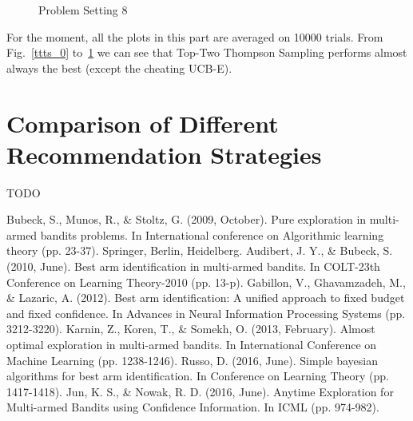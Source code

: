 \documentclass[runningheads,a4paper]{llncs}
\begin{document}
\begin{figure}%
    \centering
    \qquad
    \caption{Problem Setting 8}%
    \label{ttts_8}%
\end{figure}

For the moment, all the plots in this part are averaged on 10000 trials. From Fig.~\ref{ttts_0} to~\ref{ttts_8} we can see that Top-Two Thompson Sampling performs almost always the best (except the cheating UCB-E).

\section{Comparison of Different Recommendation Strategies}

TODO

\begin{thebibliography}{4}

 Bubeck, S., Munos, R., \& Stoltz, G. (2009, October). Pure exploration in multi-armed bandits problems. In International conference on Algorithmic learning theory (pp. 23-37). Springer, Berlin, Heidelberg.
 Audibert, J. Y., \& Bubeck, S. (2010, June). Best arm identification in multi-armed bandits. In COLT-23th Conference on Learning Theory-2010 (pp. 13-p).
 Gabillon, V., Ghavamzadeh, M., \& Lazaric, A. (2012). Best arm identification: A unified approach to fixed budget and fixed confidence. In Advances in Neural Information Processing Systems (pp. 3212-3220).
 Karnin, Z., Koren, T., \& Somekh, O. (2013, February). Almost optimal exploration in multi-armed bandits. In International Conference on Machine Learning (pp. 1238-1246).
 Russo, D. (2016, June). Simple bayesian algorithms for best arm identification. In Conference on Learning Theory (pp. 1417-1418).
 Jun, K. S., \& Nowak, R. D. (2016, June). Anytime Exploration for Multi-armed Bandits using Confidence Information. In ICML (pp. 974-982).

\end{thebibliography}


\end{document}
